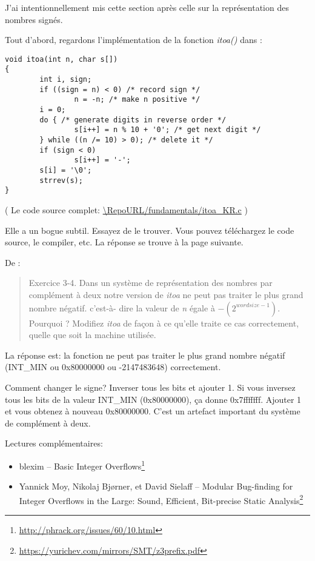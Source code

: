 
J'ai intentionnellement mis cette section après celle sur la représentation des nombres
signés.

Tout d'abord, regardons l'implémentation de la fonction  \emph{itoa()} dans \InSqBrackets{\KRBook}:

\begin{lstlisting}[style=customc]
void itoa(int n, char s[])
{
        int i, sign;
        if ((sign = n) < 0) /* record sign */
                n = -n; /* make n positive */
        i = 0;
        do { /* generate digits in reverse order */
                s[i++] = n % 10 + '0'; /* get next digit */
        } while ((n /= 10) > 0); /* delete it */
        if (sign < 0)
                s[i++] = '-';
        s[i] = '\0';
        strrev(s);
}
\end{lstlisting}

( Le code source complet: \url{\RepoURL/fundamentals/itoa_KR.c} )

Elle a un bogue subtil. Essayez de le trouver. Vous pouvez téléchargez le code source,
le compiler, etc.
La réponse se trouve à la page suivante.

\clearpage

De \InSqBrackets{\KRBook}:

\begin{framed}
\begin{quotation}
Exercice 3-4. Dans un système de représentation des nombres par complément à deux
notre version de \emph{itoa} ne peut pas traiter le plus grand nombre négatif. c'est-à-
dire la valeur de \emph{n} égale à $-(2^{wordsize-1})$. Pourquoi ? Modifiez \emph{itoa}
de façon à ce qu'elle traite ce cas correctement, quelle que soit la machine utilisée.
\end{quotation}
\end{framed}

La réponse est: la fonction ne peut pas traiter le plus grand nombre négatif (INT\_MIN
ou 0x80000000 ou -2147483648) correctement.

Comment changer le signe? Inverser tous les bits et ajouter 1.
Si vous inversez tous les bits de la valeur INT\_MIN (0x80000000), ça donne 0x7fffffff.
Ajouter 1 et vous obtenez à nouveau 0x80000000.
C'est un artefact important du système de complément à deux.

Lectures  complémentaires:

\begin{itemize}
\item blexim -- Basic Integer Overflows\footnote{\url{http://phrack.org/issues/60/10.html}}

\item Yannick Moy, Nikolaj Bjørner, et David Sielaff -- Modular Bug-finding for Integer Overflows in the Large: Sound, Efficient, Bit-precise Static Analysis\footnote{\url{https://yurichev.com/mirrors/SMT/z3prefix.pdf}}
\end{itemize}

